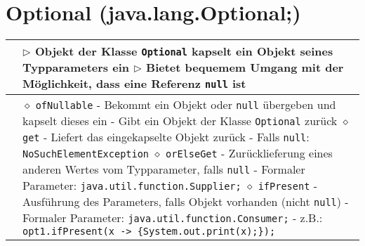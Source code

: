 \section{Optional (java.lang.Optional;)}
	\begin{tabular}{ | p{4cm} p{13.5cm} | }
	\hline
	
	\makecell[l]{Informationen} & \makecell[l]{$\rhd$ Objekt der Klasse \texttt{Optional} kapselt ein Objekt seines Typparameters ein \\
	$\rhd$ Bietet bequemem Umgang mit der Möglichkeit, dass eine Referenz \texttt{null} ist } \\ \hline

	\makecell[l]{Methoden} & \makecell[l]{
	\hspace{0.4cm} $\diamond$ \texttt{ofNullable} \\
	\hspace{0.6cm} - Bekommt ein Objekt oder \texttt{null} übergeben und kapselt dieses ein \\
	\hspace{0.6cm} - Gibt ein Objekt der Klasse \texttt{Optional} zurück \\
	\hspace{0.4cm} $\diamond$ \texttt{get} \\
	\hspace{0.6cm} - Liefert das eingekapselte Objekt zurück \\
	\hspace{0.6cm} - Falls \texttt{null}: \texttt{NoSuchElementException} \\
	\hspace{0.4cm} $\diamond$ \texttt{orElseGet} \\
	\hspace{0.6cm} - Zurücklieferung eines anderen Wertes vom Typparameter, falls \texttt{null} \\
	\hspace{0.6cm} - Formaler Parameter: \texttt{java.util.function.Supplier;} \\
	\hspace{0.4cm} $\diamond$ \texttt{ifPresent} \\
	\hspace{0.6cm} - Ausführung des Parameters, falls Objekt vorhanden (nicht \texttt{null}) \\
	\hspace{0.6cm} - Formaler Parameter: \texttt{java.util.function.Consumer;} \\
	\hspace{0.6cm} - z.B.: \texttt{opt1.ifPresent(x -> \{System.out.print(x);\});} \\
}
\end{tabular}
